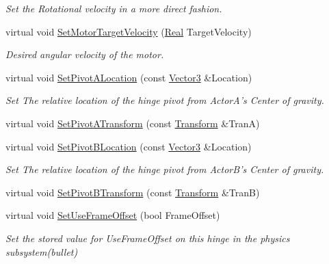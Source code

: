 \begin{DoxyCompactItemize}
\begin{DoxyCompactList}\small\item\em Set the Rotational velocity in a more direct fashion. \item\end{DoxyCompactList}\item 
virtual void \hyperlink{classMezzanine_1_1HingeConstraint_a8aa2831ceaa742ced7f120f930409e9b}{SetMotorTargetVelocity} (\hyperlink{namespaceMezzanine_a726731b1a7df72bf3583e4a97282c6f6}{Real} TargetVelocity)
\begin{DoxyCompactList}\small\item\em Desired angular velocity of the motor. \item\end{DoxyCompactList}\item 
virtual void \hyperlink{classMezzanine_1_1HingeConstraint_a0990b3b85529df353aaa46f76951fd68}{SetPivotALocation} (const \hyperlink{classMezzanine_1_1Vector3}{Vector3} \&Location)
\begin{DoxyCompactList}\small\item\em Set The relative location of the hinge pivot from ActorA's Center of gravity. \item\end{DoxyCompactList}\item 
virtual void \hyperlink{classMezzanine_1_1HingeConstraint_a44bc111ce8642c52c106af2cfe1fd7d5}{SetPivotATransform} (const \hyperlink{classMezzanine_1_1Transform}{Transform} \&TranA)
\item 
virtual void \hyperlink{classMezzanine_1_1HingeConstraint_a7ae57514d6bd1119859ecb137cf58e5e}{SetPivotBLocation} (const \hyperlink{classMezzanine_1_1Vector3}{Vector3} \&Location)
\begin{DoxyCompactList}\small\item\em Set The relative location of the hinge pivot from ActorB's Center of gravity. \item\end{DoxyCompactList}\item 
virtual void \hyperlink{classMezzanine_1_1HingeConstraint_abbe27830e0d17c44125cee59d84a9d37}{SetPivotBTransform} (const \hyperlink{classMezzanine_1_1Transform}{Transform} \&TranB)
\item 
virtual void \hyperlink{classMezzanine_1_1HingeConstraint_a9a77fd9be29d97313e6a014d4e110697}{SetUseFrameOffset} (bool FrameOffset)
\begin{DoxyCompactList}\small\item\em Set the stored value for UseFrameOffset on this hinge in the physics subsystem(bullet) \item\end{DoxyCompactList}\item 

\end{DoxyCompactItemize}
